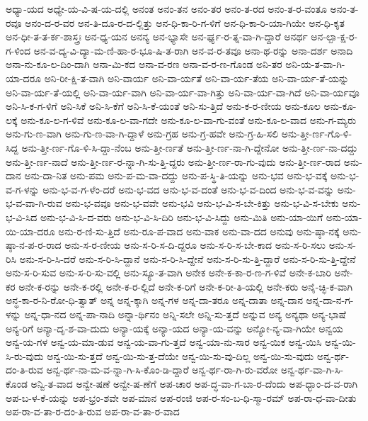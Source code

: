 {ಅಧ್ಯಾ-ಯದ
ಅಧ್ಯೇ-ಯ-ವಿ-ಷ-ಯ-ದಲ್ಲಿ
ಅನಂತ
ಅನಂ-ತನ
ಅನಂ-ತರ
ಅನಂ-ತ-ರದ
ಅನಂ-ತ-ರ-ವಂತೂ
ಅನಂ-ತ-ರವೂ
ಅನಂ-ದ-ರ-ವರ
ಅನ-ತಿ-ದೂ-ರ-ದ-ಲ್ಲಿತ್ತು
ಅನ-ಧಿ-ಕಾ-ರಿ-ಗ-ಳಿಗೆ
ಅನ-ಧಿ-ಕಾ-ರಿ-ಯಾ-ಗಿಯೇ
ಅನ-ಧಿ-ಕೃತ
ಅನ-ಧೀ-ತ-ತ-ರ್ಕ-ಶಾಸ್ತ್ರಃ
ಅನ-ಧ್ಯ-ಯನ
ಅನನ್ಯ
ಅನ-ಭ್ಯಾಸೇ
ಅನ-ರ್ಘ್ಯ-ರ-ತ್ನ-ವಾ-ಗಿ-ದ್ದಾರೆ
ಅನರ್ಥ
ಅನ-ಲ್ಪಾ-ಕ್ಷ-ರ-ಗ-ಳಿಂದ
ಅನ-ವ-ದ್ಯ-ವಿ-ದ್ಯಾ-ಮ-ಣಿ-ಹಾ-ರ-ಭೂ-ಷಿ-ತ-ರಾಗಿ
ಅನ-ವ-ರ-ತವೂ
ಅನಾ-ಥ-ರನ್ನು
ಅನಾ-ದರ್ಶ
ಅನಾದಿ
ಅನಾ-ನು-ಕೂ-ಲ-ದಿಂ-ದಾಗಿ
ಅನಾ-ಮಿ-ಕದ
ಅನಾ-ವ-ರಣ
ಅನಾ-ವ-ರ-ಣ-ಗೊಂಡ
ಅನಿ-ತರ
ಅನಿ-ಯ-ತ-ವಾ-ಗಿ-ಯಾ-ದರೂ
ಅನಿ-ರೀ-ಕ್ಷಿ-ತ-ವಾಗಿ
ಅನಿ-ವಾರ್ಯ
ಅನಿ-ವಾ-ರ್ಯತೆ
ಅನಿ-ವಾ-ರ್ಯ-ತೆಯ
ಅನಿ-ವಾ-ರ್ಯ-ತೆ-ಯನ್ನು
ಅನಿ-ವಾ-ರ್ಯ-ತೆ-ಯಲ್ಲಿ
ಅನಿ-ವಾ-ರ್ಯ-ವಾಗಿ
ಅನಿ-ವಾ-ರ್ಯ-ವಾ-ಗಿತ್ತು
ಅನಿ-ವಾ-ರ್ಯ-ವಾ-ಗಿದೆ
ಅನಿ-ವಾ-ರ್ಯವೂ
ಅನಿ-ಸಿ-ಕ-ಗ-ಳಿಗೆ
ಅನಿ-ಸಿಕೆ
ಅನಿ-ಸಿ-ಕೆಗೆ
ಅನಿ-ಸಿ-ಕೆ-ಯಂತೆ
ಅನಿ-ಸು-ತ್ತಿದೆ
ಅನು-ಕ-ರ-ಣೀಯ
ಅನು-ಕೂಲ
ಅನು-ಕೂ-ಲಕ್ಕೆ
ಅನು-ಕೂ-ಲ-ಗ-ಳಿವೆ
ಅನು-ಕೂ-ಲ-ವಾ-ಗದೇ
ಅನು-ಕೂ-ಲ-ವಾ-ಗು-ವಂತೆ
ಅನು-ಕೂ-ಲ-ವಾದ
ಅನು-ಗ-ಮ್ಯರು
ಅನು-ಗು-ಣ-ವಾಗಿ
ಅನು-ಗು-ಣ-ವಾ-ಗಿ-ದ್ದಾಳೆ
ಅನು-ಗ್ರಹ
ಅನು-ಗ್ರ-ಹವೇ
ಅನು-ಗ್ರ-ಹಿ-ಸಲಿ
ಅನು-ತ್ತೀ-ರ್ಣ-ಗೊ-ಳಿ-ಸಿದ್ದ
ಅನು-ತ್ತೀ-ರ್ಣ-ಗೊ-ಳಿ-ಸಿ-ದ್ದಾ-ನೆಂಬ
ಅನು-ತ್ತೀ-ರ್ಣತೆ
ಅನು-ತ್ತೀ-ರ್ಣ-ನಾ-ಗಿ-ದ್ದೇನೋ
ಅನು-ತ್ತೀ-ರ್ಣ-ನಾ-ದದ್ದು
ಅನು-ತ್ತೀ-ರ್ಣ-ನಾದೆ
ಅನು-ತ್ತೀ-ರ್ಣ-ರ-ನ್ನಾ-ಗಿ-ಸು-ತ್ತಿ-ದ್ದರು
ಅನು-ತ್ತೀ-ರ್ಣ-ರಾ-ಗು-ವುದು
ಅನು-ತ್ತೀ-ರ್ಣ-ರಾದ
ಅನು-ದಾನ
ಅನು-ದಾ-ನಿತ
ಅನು-ಪಮ
ಅನು-ಪ-ಮ-ವಾ-ದದ್ದು
ಅನು-ಪ-ಸ್ಥಿ-ತಿ-ಯನ್ನು
ಅನು-ಭವ
ಅನು-ಭ-ವಕ್ಕೆ
ಅನು-ಭ-ವ-ಗ-ಳನ್ನು
ಅನು-ಭ-ವ-ಗ-ಳೆಂ-ದರೆ
ಅನು-ಭ-ವದ
ಅನು-ಭ-ವ-ದಂತೆ
ಅನು-ಭ-ವ-ದಿಂದ
ಅನು-ಭ-ವ-ವನ್ನು
ಅನು-ಭ-ವ-ವಾ-ಗಿ-ರುವ
ಅನು-ಭ-ವವೂ
ಅನು-ಭ-ವವೇ
ಅನು-ಭವಿ
ಅನು-ಭ-ವಿ-ಸ-ಬೇ-ಕಿತ್ತು
ಅನು-ಭ-ವಿ-ಸ-ಬೇಕು
ಅನು-ಭ-ವಿ-ಸಿದ
ಅನು-ಭ-ವಿ-ಸಿ-ದ-ವರು
ಅನು-ಭ-ವಿ-ಸಿ-ದಿರಿ
ಅನು-ಭ-ವಿ-ಸಿದ್ದು
ಅನು-ಮಿತಿ
ಅನು-ಯಾ-ಯಿಗೆ
ಅನು-ಯಾ-ಯಿ-ಯಾ-ದರೂ
ಅನು-ರ-ಣಿ-ಸು-ತ್ತಿದೆ
ಅನು-ರೂ-ಪ-ವಾದ
ಅನು-ವಾಕ
ಅನು-ವಾ-ದದ
ಅನುವು
ಅನು-ಷ್ಠಾ-ನಕ್ಕೆ
ಅನು-ಷ್ಠಾ-ನ-ಪ-ರ-ರಾದ
ಅನು-ಸ-ರ-ಣೀಯ
ಅನು-ಸ-ರಿ-ಸ-ದಿ-ದ್ದರೂ
ಅನು-ಸ-ರಿ-ಸ-ಬೇ-ಕಾದ
ಅನು-ಸ-ರಿ-ಸಲು
ಅನು-ಸ-ರಿಸಿ
ಅನು-ಸ-ರಿ-ಸಿ-ದರೆ
ಅನು-ಸ-ರಿ-ಸಿ-ದ್ದಾನೆ
ಅನು-ಸ-ರಿ-ಸಿ-ದ್ದೇನೆ
ಅನು-ಸ-ರಿ-ಸು-ತ್ತಿ-ದ್ದಾರೆ
ಅನು-ಸ-ರಿ-ಸು-ತ್ತಿ-ದ್ದೇನೆ
ಅನು-ಸ-ರಿ-ಸುವ
ಅನು-ಸ-ರಿ-ಸು-ವಲ್ಲಿ
ಅನು-ಸ್ಯೂ-ತ-ವಾಗಿ
ಅನೇಕ
ಅನೇ-ಕ-ಕಾ-ರ-ಣ-ಗ-ಳಿವೆ
ಅನೇ-ಕ-ಬಾರಿ
ಅನೇ-ಕರ
ಅನೇ-ಕ-ರನ್ನು
ಅನೇ-ಕ-ರಲ್ಲಿ
ಅನೇ-ಕ-ರ-ಲ್ಲಿದೆ
ಅನೇ-ಕ-ರಿಗೆ
ಅನೇ-ಕ-ರೀ-ತಿ-ಯಲ್ಲಿ
ಅನೇ-ಕರು
ಅನೈ-ಚ್ಛಿ-ಕ-ವಾಗಿ
ಅನ್ಧ-ಕಾ-ರ-ನಿ-ರೋ-ಧಿ-ತ್ವಾತ್
ಅನ್ನ
ಅನ್ನ-ಕ್ಕಾಗಿ
ಅನ್ನ-ಗಳ
ಅನ್ನ-ದಾ-ತರೂ
ಅನ್ನ-ದಾತಾ
ಅನ್ನ-ದಾನ
ಅನ್ನ-ದಾ-ನ-ಗ-ಳನ್ನು
ಅನ್ನ-ಧಾ-ನದ
ಅನ್ನ-ಪಾ-ನಾದಿ
ಅನ್ನಾ-ರ್ಥಿನಂ
ಅನ್ನಿ-ಸಲೇ
ಅನ್ನಿ-ಸು-ತ್ತದೆ
ಅನ್ನುವ
ಅನ್ಯ
ಅನ್ಯಥಾ
ಅನ್ಯ-ಭಾಷೆ
ಅನ್ಯ-ರಿಗೆ
ಅನ್ಯಾ-ದೃ-ಶ-ವಾ-ದುದು
ಅನ್ಯಾ-ಯಕ್ಕೆ
ಅನ್ಯಾ-ಯದ
ಅನ್ಯಾ-ಯ-ವನ್ನು
ಅನ್ಯೋ-ನ್ಯ-ವಾ-ಗಿಯೇ
ಅನ್ವಯ
ಅನ್ವ-ಯ-ಗಳ
ಅನ್ವ-ಯ-ಮಾ-ಡುವ
ಅನ್ವ-ಯ-ವಾ-ಗು-ತ್ತದೆ
ಅನ್ವ-ಯಾ-ನು-ಸಾರ
ಅನ್ವ-ಯಿಕ
ಅನ್ವ-ಯಿಸಿ
ಅನ್ವ-ಯಿ-ಸಿ-ರು-ವುದು
ಅನ್ವ-ಯಿ-ಸು-ತ್ತದೆ
ಅನ್ವ-ಯಿ-ಸು-ತ್ತ-ದೆಯೇ
ಅನ್ವ-ಯಿ-ಸು-ವು-ದಿಲ್ಲ
ಅನ್ವ-ಯಿ-ಸು-ವುದು
ಅನ್ವ-ರ್ಥ-ದಂ-ತಿ-ರುವ
ಅನ್ವ-ರ್ಥ-ನಾ-ಮ-ವ-ನ್ನಾ-ಗಿ-ಸಿ-ಕೊಂ-ಡಿ-ದ್ದಾರೆ
ಅನ್ವ-ರ್ಥ-ರಾ-ಗಿ-ರು-ವರೋ
ಅನ್ವ-ರ್ಥ-ವಾ-ಗಿ-ಸಿ-ಕೊಂಡ
ಅನ್ವಿ-ತ-ವಾದ
ಅನ್ವೇ-ಷಣೆ
ಅನ್ವೇ-ಷ-ಣೆಗೆ
ಅಪ-ಚಾರ
ಅಪ-ದ್ಧ-ವಾ-ಗ-ಬಾ-ರ-ದೆಂದು
ಅಪ-ಧ್ಭಾಂ-ದ-ವ-ರಾಗಿ
ಅಪ-ಬ-ಳ-ಕೆ-ಯನ್ನು
ಅಪ-ಭ್ರಂ-ಶವೇ
ಅಪ-ಮಾನ
ಅಪ-ರಂಜಿ
ಅಪ-ರ-ಸಂ-ಬ-ಧಿ-ಸ್ಮಾ-ರಮ್
ಅಪ-ರಾ-ಧ-ವಾ-ದೀತು
ಅಪ-ರಾ-ವ-ತಾ-ರ-ದಂ-ತಿ-ರುವ
ಅಪ-ರಾ-ವ-ತಾ-ರ-ವಾದ
}
